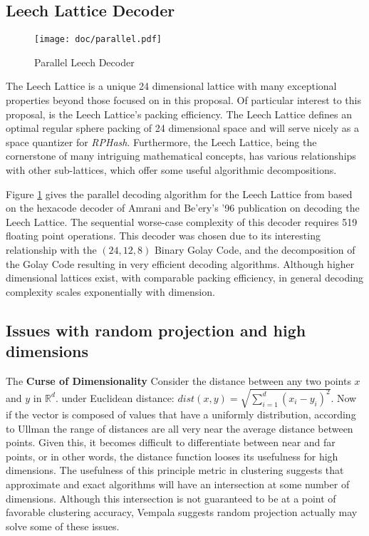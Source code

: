 \documentclass[a4paper,10pt]{article}
\begin{document}
\subsection{Leech Lattice Decoder}
\begin{figure}%
\centering
\texttt{[image: doc/parallel.pdf]}
\caption{\label{leech}Parallel Leech Decoder\cite{carraher}}
\end{figure}
The Leech Lattice is a unique 24 dimensional lattice with many exceptional
properties beyond those focused on in this proposal\cite{Curtis,SPLAG}.
Of particular interest to this proposal, is the Leech Lattice's packing
efficiency.  The Leech Lattice defines an optimal regular sphere packing of
24 dimensional space\cite{leech} and will serve nicely as a space quantizer
for \emph{RPHash}.  Furthermore, the Leech Lattice, being the cornerstone
of many intriguing mathematical concepts, has various relationships with
other sub-lattices, which offer some useful algorithmic decompositions.

Figure \ref{leech} gives the parallel decoding algorithm for the Leech
Lattice from \cite{carraher-1} based on the hexacode decoder of Amrani
and Be'ery's '96\cite{Amrani} publication on decoding the Leech Lattice.
The sequential worse-case complexity of this decoder requires 519 floating
point operations.  This decoder was chosen due to its interesting relationship
with the $(24,12,8)$ Binary Golay Code, and the decomposition of the Golay
Code resulting in very efficient decoding algorithms.  Although higher
dimensional lattices exist, with comparable packing efficiency, in general
decoding complexity scales exponentially with dimension\cite{Tarokh1,Agrell}.

\subsection{Issues with random projection and high dimensions} The
\textbf{Curse of Dimensionality} Consider the distance between any two
points $x$ and $y$ in $\mathbb{R}^d$.  under Euclidean distance: $dist(x,y)
=\sqrt{\sum^{d}_{i=1}{(x_i-y_i)^{2}}}$.  Now if the vector is composed of
values that have a uniformly distribution, according to Ullman \cite{Ullman}
the range of distances are all very near the average distance between points.
Given this, it becomes difficult to differentiate between near and far
points, or in other words, the distance function looses its usefulness for
high dimensions\cite{Beyer,Han2006}.  The usefulness of this principle
metric in clustering suggests that approximate and exact algorithms
will have an intersection at some number of dimensions.  Although this
intersection is not guaranteed to be at a point of favorable clustering
accuracy, Vempala suggests random projection actually may solve some of
these issues\cite{vempala,bingham}.
\end{document}
